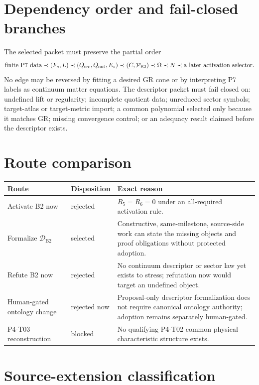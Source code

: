 \documentclass[11pt]{article}
\newcommand{\Btwo}{\mathrm{B2}}
\newcommand{\Desc}{\mathcal{D}_{\Btwo}}
\newcommand{\Psrc}{\mathcal{P}_{\Btwo}}
\begin{document}
\section{Dependency order and fail-closed branches}

The selected packet must preserve the partial order
\[
 \text{finite P7 data}
 \prec (F_s,L)
 \prec (Q_{\rm src},Q_{\rm out},E_s)
 \prec (C,\Psrc)
 \prec \Omega
 \prec N
 \prec \text{a later activation selector}.
\]
No edge may be reversed by fitting a desired GR cone or by interpreting P7
labels as continuum matter equations. The descriptor packet must fail closed
on: undefined lift or regularity; incomplete quotient data; unreduced sector
symbols; target-atlas or target-metric import; a common polynomial selected
only because it matches GR; missing convergence control; or an adequacy result
claimed before the descriptor exists.

\section{Route comparison}

\begin{longtable}{>{\raggedright\arraybackslash}p{}>{\raggedright\arraybackslash}p{}>{\raggedright\arraybackslash}p{}}
\toprule
Route & Disposition & Exact reason\\
\midrule
Activate B2 now & rejected & $R_5=R_6=0$ under an all-required activation rule.\\
Formalize $\Desc$ & selected & Constructive, same-milestone, source-side work can state the missing objects and proof obligations without protected adoption.\\
Refute B2 now & rejected & No continuum descriptor or sector law yet exists to stress; refutation now would target an undefined object.\\
Human-gated ontology change & rejected now & Proposal-only descriptor formalization does not require canonical ontology authority; adoption remains separately human-gated.\\
P4-T03 reconstruction & blocked & No qualifying P4-T02 common physical characteristic structure exists.\\
\bottomrule
\end{longtable}

\section{Source-extension classification}
\end{document}
